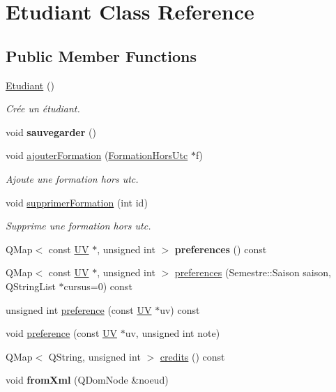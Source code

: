 \hypertarget{classEtudiant}{\section{Etudiant Class Reference}
\label{classEtudiant}
}
\subsection*{Public Member Functions}
\begin{DoxyCompactItemize}
\item 
\hypertarget{classEtudiant_abfb4e7f3a5faac571517798e059242a4}{\hyperlink{classEtudiant_abfb4e7f3a5faac571517798e059242a4}{Etudiant} ()}\label{classEtudiant_abfb4e7f3a5faac571517798e059242a4}

\begin{DoxyCompactList}\small\item\em Crée un étudiant. \end{DoxyCompactList}\item 
\hypertarget{classEtudiant_a92040e42a52bb569770130c4d386d772}{void {\bfseries sauvegarder} ()}\label{classEtudiant_a92040e42a52bb569770130c4d386d772}

\item 
void \hyperlink{classEtudiant_a79a952f749699752e2fe93931794c0e2}{ajouter\+Formation} (\hyperlink{classFormationHorsUtc}{Formation\+Hors\+Utc} $\ast$f)
\begin{DoxyCompactList}\small\item\em Ajoute une formation hors utc. \end{DoxyCompactList}\item 
void \hyperlink{classEtudiant_a1c0fb87520ceaf9d9ca21988f7b5890a}{supprimer\+Formation} (int id)
\begin{DoxyCompactList}\small\item\em Supprime une formation hors utc. \end{DoxyCompactList}\item 
\hypertarget{classEtudiant_a4bc1732ed51c86b1316de31d99b04e7a}{Q\+Map$<$ const \hyperlink{classUV}{U\+V} $\ast$, unsigned int $>$ {\bfseries preferences} () const }\label{classEtudiant_a4bc1732ed51c86b1316de31d99b04e7a}

\item 
Q\+Map$<$ const \hyperlink{classUV}{U\+V} $\ast$, unsigned int $>$ \hyperlink{classEtudiant_a259cf9606f05adae7883defde1447e58}{preferences} (Semestre\+::\+Saison saison, Q\+String\+List $\ast$cursus=0) const 
\item 
unsigned int \hyperlink{classEtudiant_a8522ce46994fe15c22ef2085fe9953d7}{preference} (const \hyperlink{classUV}{U\+V} $\ast$uv) const 
\item 
void \hyperlink{classEtudiant_a3a5b8c8db5e73ff9f3330d97f3046549}{preference} (const \hyperlink{classUV}{U\+V} $\ast$uv, unsigned int note)
\item 
Q\+Map$<$ Q\+String, unsigned int $>$ \hyperlink{classEtudiant_aa4164906f6683277ea24ca05a0181bd6}{credits} () const 
\item 
\hypertarget{classEtudiant_a9f586beaf42634dc5d81fbe06cbcfe2a}{void {\bfseries from\+Xml} (Q\+Dom\+Node \&noeud)}\label{classEtudiant_a9f586beaf42634dc5d81fbe06cbcfe2a}


\end{DoxyCompactItemize}
